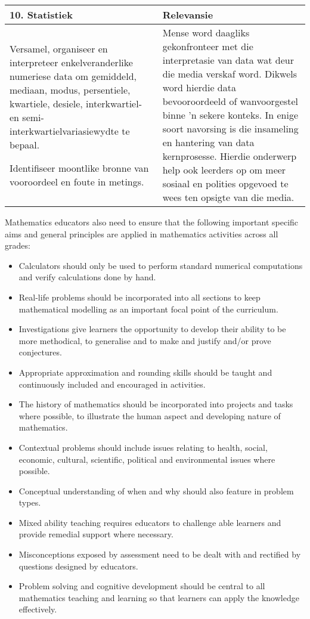 \begin{table}[H]
 \begin{center} 
\begin{tabular}{|p{8.5cm}|p{3.5cm}|} \hline
\textbf{10. Statistiek}& \textbf{Relevansie}\\ \hline  
Versamel, organiseer en interpreteer enkelveranderlike numeriese data
om gemiddeld, mediaan, modus, persentiele, kwartiele, desiele,
interkwartiel- en semi-interkwartielvariasiewydte te bepaal.\par
Identifiseer moontlike bronne van vooroordeel en foute in metings.
&
Mense word daagliks gekonfronteer met die interpretasie van data wat
deur die media verskaf word. Dikwels word hierdie data bevooroordeeld of
wanvoorgestel binne 'n sekere konteks. In enige soort navorsing is die
insameling en hantering van data kernprosesse. Hierdie onderwerp help
ook leerders op om meer sosiaal en polities opgevoed te wees ten
opsigte van die media.
\\ \hline

 \end{tabular}
\end{center}
\end{table}

Mathematics educators also need to ensure that the following important specific aims and general principles are applied in mathematics activities across all grades:
\begin{itemize}[noitemsep]
\item Calculators should only be used to perform standard numerical computations and verify calculations done by hand.
\item Real-life problems should be incorporated into all sections to keep mathematical modelling as an important focal point of the curriculum.
\item Investigations give learners the opportunity to develop their ability to be more methodical, to generalise and to make and justify and/or prove conjectures.
\item Appropriate approximation and rounding skills should be taught and continuously included and encouraged in activities.
\item The history of mathematics should be incorporated into projects and tasks where possible, to illustrate the human aspect and developing nature of mathematics. 
\item Contextual problems should include issues relating to health, social, economic, cultural, scientific, political and environmental issues where possible. 
\item Conceptual understanding of when and why should also feature in problem types.
\item Mixed ability teaching requires educators to challenge able learners and provide remedial support where necessary. 
\item Misconceptions exposed by assessment need to be dealt with and rectified by questions designed by educators. 
\item Problem solving and cognitive development should be central to all mathematics teaching and learning so that learners can apply the knowledge effectively. 
\end{itemize}

